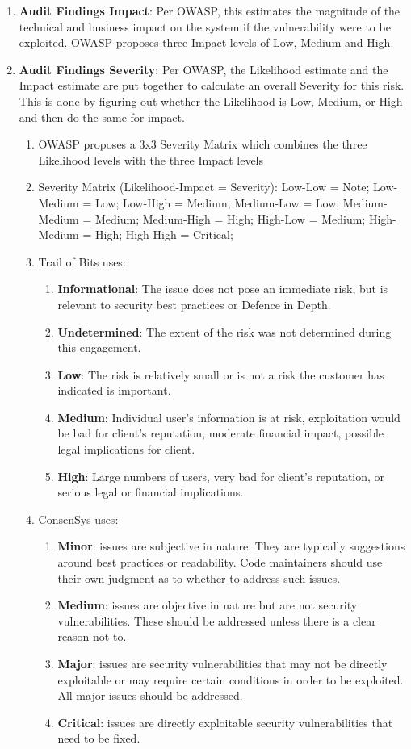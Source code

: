 \begin{enumerate}
\item\textbf{Audit Findings Impact}: Per OWASP, this estimates the magnitude of the technical and business impact on the system if the vulnerability were to be exploited. OWASP proposes three Impact levels of Low, Medium and High.

\item\textbf{Audit Findings Severity}: Per OWASP, the Likelihood estimate and the Impact estimate are put together to calculate an overall Severity for this risk. This is done by figuring out whether the Likelihood is Low, Medium, or High and then do the same for impact.
	\begin{enumerate}
	\item OWASP proposes a 3x3 Severity Matrix which combines the three Likelihood levels with the three Impact levels
	\item Severity Matrix (Likelihood-Impact = Severity): Low-Low = Note; Low-Medium = Low; Low-High = Medium; Medium-Low = Low; Medium-Medium = Medium; Medium-High = High; High-Low = Medium; High-Medium = High; High-High = Critical;
	\item Trail of Bits uses:
	    \begin{enumerate}
	    \item\textbf{Informational}: The issue does not pose an immediate risk, but is relevant to security best practices or Defence in Depth.
	    \item\textbf{Undetermined}: The extent of the risk was not determined during this engagement.
	    \item\textbf{Low}: The risk is relatively small or is not a risk the customer has indicated is important.
	    \item\textbf{Medium}: Individual user’s information is at risk, exploitation would be bad for client’s reputation, moderate financial impact, possible legal implications for client.
	    \item\textbf{High}: Large numbers of users, very bad for client’s reputation, or serious legal or financial implications.
	    \end{enumerate}
	\item ConsenSys uses:
	    \begin{enumerate}
	    \item\textbf{Minor}: issues are subjective in nature. They are typically suggestions around best practices or readability. Code maintainers should use their own judgment as to whether to address such issues.
	    \item\textbf{Medium}: issues are objective in nature but are not security vulnerabilities. These should be addressed unless there is a clear reason not to.
	    \item\textbf{Major}: issues are security vulnerabilities that may not be directly exploitable or may require certain conditions in order to be exploited. All major issues should be addressed.
	    \item\textbf{Critical}: issues are directly exploitable security vulnerabilities that need to be fixed.
	    \end{enumerate}
	\end{enumerate}


\end{enumerate}
